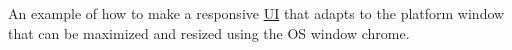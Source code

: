 An example of how to make a responsive \mbox{\hyperlink{class_u_i}{UI}} that adapts to the platform window that can be maximized and resized using the OS window chrome. 